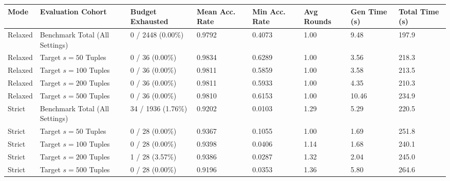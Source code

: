 \begin{tabular}{llllllll}
\toprule
Mode & Evaluation Cohort & Budget Exhausted & Mean Acc. Rate & Min Acc. Rate & Avg Rounds & Gen Time (s) & Total Time (s) \\
\midrule
Relaxed & Benchmark Total (All Settings) & 0 / 2448 (0.00\%) & 0.9792 & 0.4073 & 1.00 & 9.48 & 197.9 \\
Relaxed & Target $s=50$ Tuples & 0 / 36 (0.00\%) & 0.9834 & 0.6289 & 1.00 & 3.56 & 218.3 \\
Relaxed & Target $s=100$ Tuples & 0 / 36 (0.00\%) & 0.9811 & 0.5859 & 1.00 & 3.58 & 213.5 \\
Relaxed & Target $s=200$ Tuples & 0 / 36 (0.00\%) & 0.9811 & 0.5933 & 1.00 & 4.35 & 210.3 \\
Relaxed & Target $s=500$ Tuples & 0 / 36 (0.00\%) & 0.9810 & 0.6153 & 1.00 & 10.46 & 234.9 \\
Strict & Benchmark Total (All Settings) & 34 / 1936 (1.76\%) & 0.9202 & 0.0103 & 1.29 & 5.29 & 220.5 \\
Strict & Target $s=50$ Tuples & 0 / 28 (0.00\%) & 0.9367 & 0.1055 & 1.00 & 1.69 & 251.8 \\
Strict & Target $s=100$ Tuples & 0 / 28 (0.00\%) & 0.9398 & 0.0406 & 1.14 & 1.68 & 240.1 \\
Strict & Target $s=200$ Tuples & 1 / 28 (3.57\%) & 0.9386 & 0.0287 & 1.32 & 2.04 & 245.0 \\
Strict & Target $s=500$ Tuples & 0 / 28 (0.00\%) & 0.9196 & 0.0353 & 1.36 & 5.80 & 264.6 \\
\bottomrule
\end{tabular}

